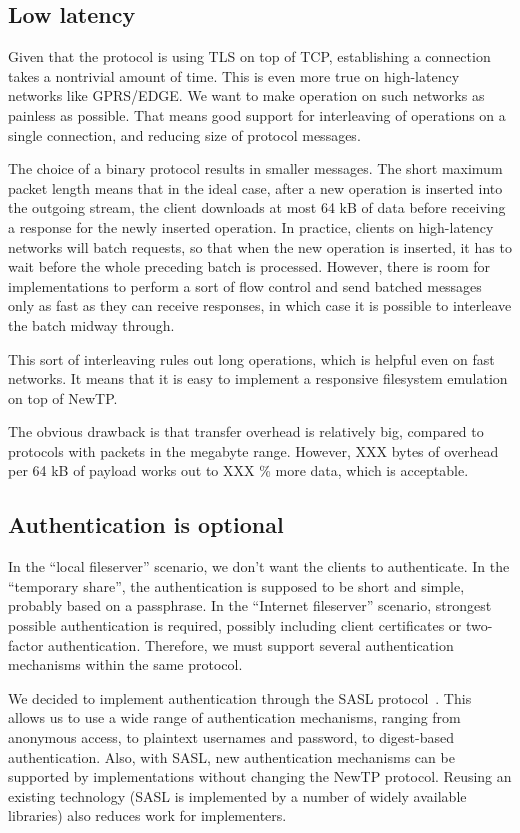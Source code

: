 \subsection{Low latency}

Given that the protocol is using TLS on top of TCP, establishing a connection takes a nontrivial amount of
time. This is even more true on high-latency networks like GPRS/EDGE. We want to make operation on such
networks as painless as possible. That means good support for interleaving of operations on a single
connection, and reducing size of protocol messages.

The choice of a binary protocol results in smaller messages. The short maximum packet length means that in the
ideal case, after a new operation is inserted into the outgoing stream, the client downloads at most 64 kB of
data before receiving a response for the newly inserted operation. In practice, clients on high-latency
networks will batch requests, so that when the new operation is inserted, it has to wait before the whole
preceding batch is processed. However, there is room for implementations to perform a sort of flow control and
send batched messages only as fast as they can receive responses, in which case it is possible to interleave
the batch midway through.

This sort of interleaving rules out long operations, which is helpful even on fast networks. It means that it
is easy to implement a responsive filesystem emulation on top of NewTP.

The obvious drawback is that transfer overhead is relatively big, compared to protocols with packets in the
megabyte range. However, XXX bytes of overhead per 64 kB of payload works out to XXX \% more data, which is
acceptable.

\subsection{Authentication is optional}

In the ``local fileserver'' scenario, we don't want the clients to authenticate. In the ``temporary share'',
the authentication is supposed to be short and simple, probably based on a passphrase. In the ``Internet
fileserver'' scenario, strongest possible authentication is required, possibly including client certificates
or two-factor authentication. Therefore, we must support several authentication mechanisms within the same
protocol.

We decided to implement authentication through the SASL protocol~\cite{rfc4422}. This allows us to use a wide
range of authentication mechanisms, ranging from anonymous access, to plaintext usernames and password, to
digest-based authentication. Also, with SASL, new authentication mechanisms can be supported by
implementations without changing the NewTP protocol. Reusing an existing technology (SASL is implemented by
a number of widely available libraries) also reduces work for implementers.

